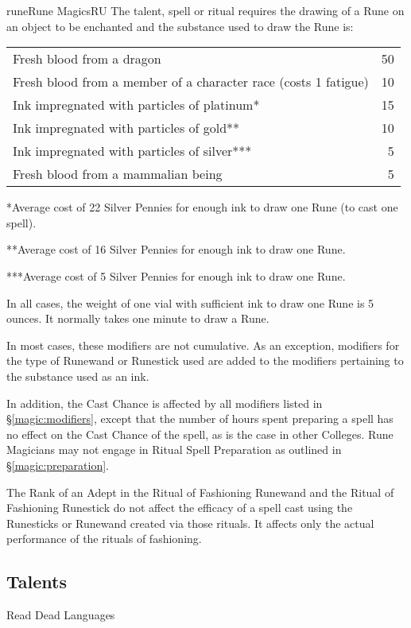 \begin{college}[1.1]{rune}{Rune Magics}{RU}
The talent, spell or ritual requires the drawing of a Rune on an
object to be enchanted and the substance used to draw the Rune is:

\begin{tabularx}{\linewidth}{Xr}
Fresh blood from a dragon           & 50 \\
Fresh blood from a member of a character race (costs 1 fatigue) & 10 \\
Ink impregnated with particles of platinum* & 15 \\
Ink impregnated with particles of gold** & 10 \\
Ink impregnated with particles of silver*** & 5 \\
Fresh blood from a mammalian being & 5 \\
\end{tabularx}

*Average cost of 22 Silver Pennies for enough ink to draw one Rune
(\ie to cast one spell).

**Average cost of 16 Silver Pennies for enough ink to draw one Rune.

***Average cost of 5 Silver Pennies for enough ink to draw one Rune.

In all cases, the weight of one vial with sufficient ink to draw one
Rune is 5 ounces. It normally takes one minute to draw a Rune.

In most cases, these modifiers are not cumulative.  As an exception,
modifiers for the type of Runewand or Runestick used are added to the
modifiers pertaining to the substance used as an ink.

In addition, the Cast Chance is affected by all modifiers listed in
\S\ref{magic:modifiers}, except that the number of hours spent
preparing a spell has no effect on the Cast Chance of the spell, as is
the case in other Colleges.  Rune Magicians may not engage in Ritual
Spell Preparation as outlined in \S\ref{magic:preparation}.

The Rank of an Adept in the Ritual of Fashioning Runewand and the
Ritual of Fashioning Runestick do not affect the efficacy of a spell
cast using the Runesticks or Runewand created via those rituals. It
affects only the actual performance of the rituals of fashioning.

\subsection{Talents}

\begin{talent}[T-1]{Read Dead Languages}


\end{talent}
\end{college}
